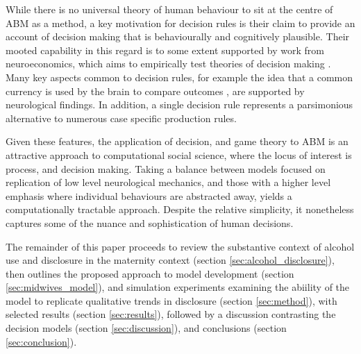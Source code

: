 While there is no universal theory of human behaviour to sit at the centre of \ac{ABM} as a method, a key motivation for decision rules is their claim to provide an account of decision making that is behaviourally and cognitively plausible. Their mooted capability in this regard is to some extent supported by work from neuroeconomics, which aims to empirically test theories of decision making \citep{Rustichini2009}. Many key aspects common to decision rules, for example the idea that a common currency is used by the brain to compare outcomes \citep{Padoa-Schioppa2006,Padoa-Schioppa2008}, are supported by neurological findings. In addition, a single decision rule represents a parsimonious alternative to numerous case specific production rules. 

Given these features, the application of decision, and game theory to \ac{ABM} is an attractive approach to computational social science, where the locus of interest is process, and decision making. Taking a balance between models focused on replication of low level neurological mechanics, and those with a higher level emphasis where individual behaviours are abstracted away, yields a computationally tractable approach. Despite the relative simplicity, it nonetheless captures some of the nuance and sophistication of human decisions.


The remainder of this paper proceeds to review the substantive context of alcohol use and disclosure in the maternity context (section \ref{sec:alcohol_disclosure}), then outlines the proposed approach to model development (section \ref{sec:midwives_model}), and simulation experiments examining the abiility of the model to replicate qualitative trends in disclosure (section \ref{sec:method}), with selected results (section \ref{sec:results}), followed by a discussion contrasting the decision models (section \ref{sec:discussion}), and conclusions (section \ref{sec:conclusion}).